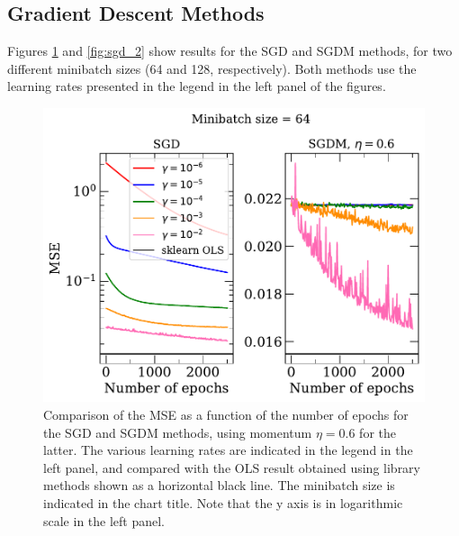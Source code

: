 \documentclass[a4paper,
amsfonts,
amssymb,
amsmath,
reprint,
showkeys,
nofootinbib,
twoside]{revtex4-2}
\begin{document}
\subsection{Gradient Descent Methods}
Figures \ref{fig:sgd_1} and \ref{fig:sgd_2} show results for the SGD and SGDM methods, for two different minibatch sizes (64 and 128, respectively). Both methods use the learning rates presented in the legend in the left panel of the figures.

\begin{figure} [h]
    \centering
    \includegraphics[width = \columnwidth]{Figures/sgd_1.pdf}
    \caption{Comparison of the MSE as a function of the number of epochs for the SGD and SGDM methods, using momentum $\eta = 0.6$ for the latter. The various learning rates are indicated in the legend in the left panel, and compared with the OLS result obtained using library methods shown as a horizontal black line. The minibatch size is indicated in the chart title. Note that the y axis is in logarithmic scale in the left panel. }
    \label{fig:sgd_1}
\end{figure}
\end{document}
